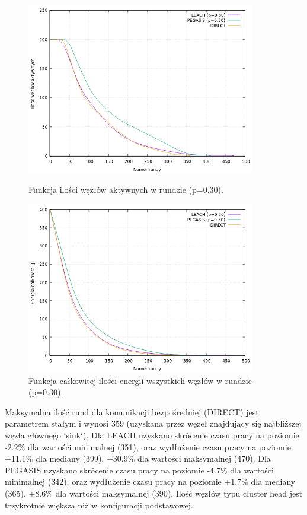 \documentclass[a4paper,12pt,twoside,openany]{report}
\begin{document}
\begin{figure}[H]
 \centering
 \includegraphics[width=10cm]{images/gnuplot/test_4/nodes_in_round_p030.png}
 \caption{Funkcja ilości węzłów aktywnych w rundzie (p=0.30).}
 \includegraphics[width=10cm]{images/gnuplot/test_4/energy_in_round_p030.png}
 \caption{Funkcja całkowitej ilości energii wszystkich węzłów w rundzie (p=0.30).}
\end{figure}

\par
Maksymalna ilość rund dla komunikacji bezpośredniej (DIRECT) jest parametrem stałym i wynosi 359 (uzyskana przez węzeł znajdujący się najbliższej węzła głównego `sink`).
Dla LEACH uzyskano skrócenie czasu pracy na poziomie -2.2\% dla wartości minimalnej (351), oraz wydłużenie czasu pracy na poziomie +11.1\% dla mediany (399), +30.9\% dla wartości maksymalnej (470).
Dla PEGASIS uzyskano skrócenie czasu pracy na poziomie -4.7\% dla wartości minimalnej (342), oraz wydłużenie czasu pracy na poziomie +1.7\% dla mediany (365), +8.6\% dla wartości maksymalnej (390).
Ilość węzłów typu cluster head jest trzykrotnie większa niż w konfiguracji podstawowej.
\end{document}
